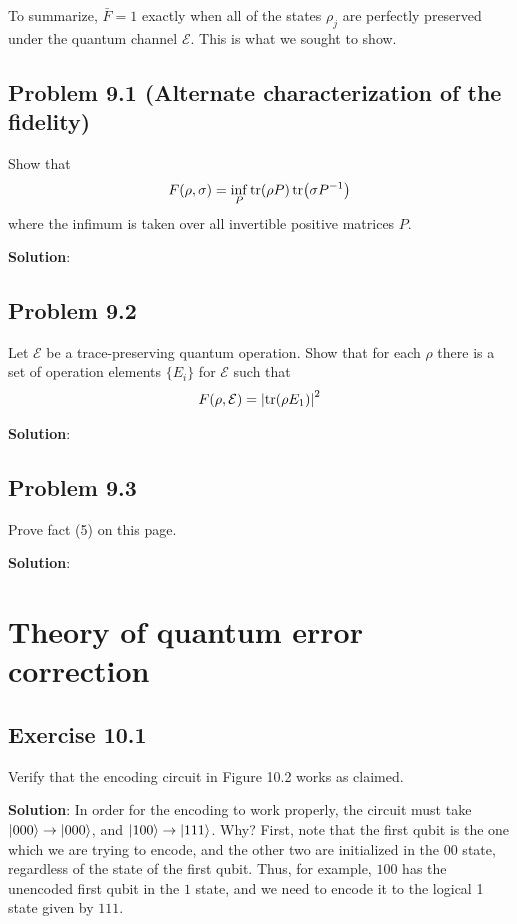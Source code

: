 \documentclass{book}
\newcommand{\mc}[1]{\mathcal{#1}}
\begin{document}
    To summarize, $\bar{F} = 1$ exactly when all of the states $\rho_j$ are perfectly preserved under the quantum channel $\mc{E}$. This is what we sought to show.

\section*{Problem 9.1 (Alternate characterization of the fidelity)}
    Show that 
    \begin{align}
        F(\rho, \sigma) = \inf_P \tr(\rho P) \tr(\sigma P^{-1})
    \end{align}
    where the infimum is taken over all invertible positive matrices $P$.

    \textbf{Solution}:

\section*{Problem 9.2}
    Let $\mc{E}$ be a trace-preserving quantum operation. Show that for each $\rho$ there is a set of operation elements $\{E_i\}$ for $\mc{E}$ such that
    \begin{align}
        F(\rho, \mc{E}) = \abs{\tr(\rho E_1)}^2
    \end{align}

    \textbf{Solution}: 

\section*{Problem 9.3}
    Prove fact (5) on this page.

    \textbf{Solution}:

\chapter{Theory of quantum error correction}

\section*{Exercise 10.1}
    Verify that the encoding circuit in Figure 10.2 works as claimed.
    
    \textbf{Solution}: In order for the encoding to work properly, the circuit must take $\ket{000} \rightarrow \ket{000}$, and $\ket{100} \rightarrow \ket{111}$. Why? First, note that the first qubit is the one which we are trying to encode, and the other two are initialized in the $00$ state, regardless of the state of the first qubit. Thus, for example, $100$ has the unencoded first qubit in the $1$ state, and we need to encode it to the logical 1 state given by $111$. 
    
\end{document}
